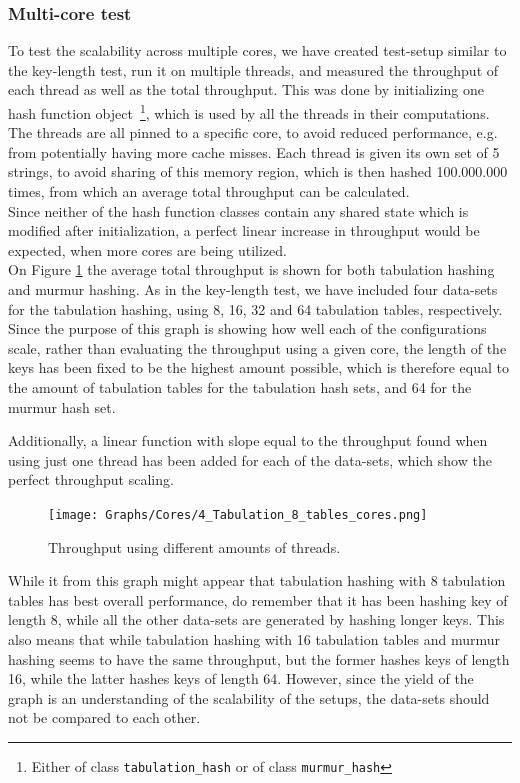 \documentclass[11pt]{article} %
\begin{document}
\subsubsection{Multi-core test}
To test the scalability across multiple cores, we have created test-setup similar to the key-length test, run it on multiple threads, and measured the throughput of each thread as well as the total throughput. This was done by initializing one hash function object~\footnote{Either of class \verb|tabulation_hash| or of class \verb|murmur_hash|}, which is used by all the threads in their computations. The threads are all pinned to a specific core, to avoid reduced performance, e.g. from potentially having more cache misses. Each thread is given its own set of 5 strings, to avoid sharing of this memory region, which is then hashed 100.000.000 times, from which an average total throughput can be calculated. \\

Since neither of the hash function classes contain any shared state which is modified after initialization, a perfect linear increase in throughput would be expected, when more cores are being utilized.\\

On Figure \ref{fig:tab_cores} the average total throughput is shown for both tabulation hashing and murmur hashing. As in the key-length test, we have included four data-sets for the tabulation hashing, using 8, 16, 32 and 64 tabulation tables, respectively. Since the purpose of this graph is showing how well each of the configurations scale, rather than evaluating the throughput using a given core, the length of the keys has been fixed to be the highest amount possible, which is therefore equal to the amount of tabulation tables for the tabulation hash sets, and 64 for the murmur hash set. 

Additionally, a linear function with slope equal to the throughput found when using just one thread has been added for each of the data-sets, which show the perfect throughput scaling.\\

\begin{figure}[H]
  \texttt{[image: Graphs/Cores/4\_Tabulation\_8\_tables\_cores.png]}\\
  \caption{Throughput using different amounts of threads.}\label{fig:tab_cores}
\end{figure}
While it from this graph might appear that tabulation hashing with 8 tabulation tables has best overall performance, do remember that it has been hashing key of length 8, while all the other data-sets are generated by hashing longer keys. This also means that while tabulation hashing with 16 tabulation tables and murmur hashing seems to have the same throughput, but the former hashes keys of length 16, while the latter hashes keys of length 64. However, since the yield of the graph is an understanding of the scalability of the setups, the data-sets should not be compared to each other.\\
\end{document}
